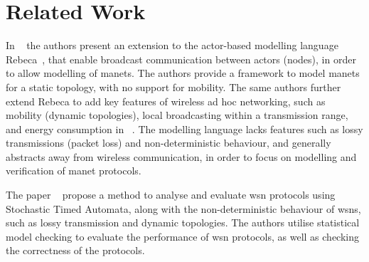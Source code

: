 \section{Related Work}\label{sec:relatedworks}




In ~\cite{DBLP:conf/fsen/YousefiGK15} the authors present an extension to the actor-based modelling language Rebeca~\cite{Sirjani2004ModelingAV}, that enable broadcast communication between actors (nodes), in order to allow modelling of \gls{manet}s. The authors provide a framework to model \gls{manet}s for a static topology, with no support for mobility. The same authors further extend Rebeca to add key features of wireless ad hoc networking, such as mobility (dynamic topologies), local broadcasting within a transmission range, and energy consumption in ~\cite{DBLP:journals/fac/YousefiGK17}. The modelling language lacks features such as lossy transmissions (packet loss) and non-deterministic behaviour, and generally abstracts away from wireless communication, in order to focus on modelling and verification of \gls{manet} protocols.\smallbreak

The paper ~\cite{article:maeofwsnpbsta} propose a method to analyse and evaluate \gls{wsn} protocols using Stochastic Timed Automata, along with the non-deterministic behaviour of \gls{wsn}s, such as lossy transmission and dynamic topologies. The authors utilise statistical model checking to evaluate the performance of \gls{wsn} protocols, as well as checking the correctness of the protocols.\smallbreak